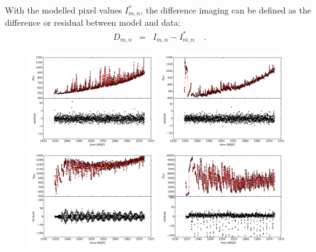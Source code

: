 \documentclass[12pt, preprint]{aastex}
\begin{document}
With the modelled pixel values $I^{\ast}_{m,n}$, the difference imaging can be defined as the difference or residual between model and data:
\begin{eqnarray}
D_{m,n} &=& I_{m,n} - I^{\ast}_{m,n}
\quad.
\end{eqnarray}

\begin{figure}[p]
\begin{center}
\includegraphics[width=0.49\textwidth]{f1a}
\includegraphics[width=0.49\textwidth]{f1b}
\includegraphics[width=0.49\textwidth]{f1c}
\includegraphics[width=0.49\textwidth]{f1d}


\end{center}
\end{figure}
\end{document}
